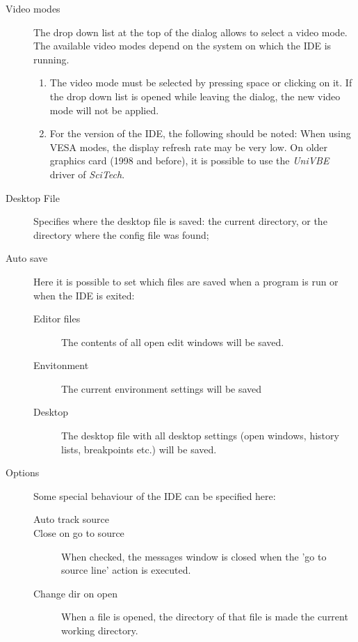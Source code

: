 \begin{description}
\item[Video modes]
The drop down list at the top of the dialog allows to select a video mode.
The available video modes depend on the system on which the IDE
is running. 
\begin{remark}
\begin{enumerate}
\item The video mode must be selected by pressing space or clicking
on it. If the drop down list is opened while leaving the dialog,
the new video mode will not be applied.
\item For the \dos version of the IDE, the following should be noted:
When using VESA modes, the display refresh rate may be very low. 
On older graphics card (1998 and before), it is possible to use the
{\em UniVBE} driver of {\em SciTech}.
\end{enumerate}
\end{remark}
\item[Desktop File]
Specifies where the desktop file is saved: the current directory, or the
directory where the config file was found;
\item[Auto save]
Here it is possible to set which files are saved when a program is run or
when the IDE is exited:
\begin{description}
\item[Editor files] The contents of all open edit windows will be saved.
\item[Envitonment] The current environment settings will be saved
\item[Desktop] The desktop file with all desktop settings (open windows,
history lists, breakpoints etc.) will be saved.
\end{description}
\item[Options] 
Some special behaviour of the IDE can be specified here:
\begin{description}
\item[Auto track source]
\item[Close on go to source] When checked, the messages window is closed 
when the 'go to source line' action is executed.
\item[Change dir on open] When a file is opened, the directory of that file
is made the current working directory.
\end{description}
\end{description}
%
%
